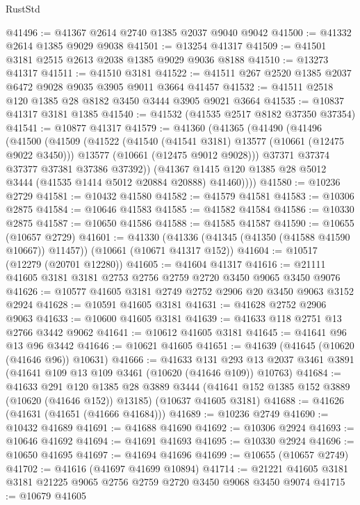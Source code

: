 \begin{lexlean}{RustStd}
\begin{coremodule}
@41496 := @41367 @2614 @2740 @1385 @2037 @9040 @9042
@41500 := @41332 @2614 @1385 @9029 @9038
@41501 := @13254 @41317
@41509 := @41501 @3181 @2515 @2613 @2038 @1385 @9029 @9036 @8188
@41510 := @13273 @41317
@41511 := @41510 @3181
@41522 := @41511 @267 @2520 @1385 @2037 @6472 @9028 @9035 @3905 @9011 @3664 @41457
@41532 := @41511 @2518 @120 @1385 @28 @8182 @3450 @3444 @3905 @9021 @3664
@41535 := @10837 @41317 @3181 @1385
@41540 := @41532 (@41535 @2517 @8182 @37350 @37354)
@41541 := @10877 @41317
@41579 := @41360
    (@41365
      (@41490
        (@41496
          (@41500
            (@41509
              (@41522
                (@41540 (@41541 @3181) @13577 (@10661 (@12475 @9022 @3450)))
                @13577
                (@10661 (@12475 @9012 @9028)))
              @37371
              @37374
              @37377
              @37381
              @37386
              @37392))
          (@41367 @1415 @120 @1385 @28 @5012 @3444 (@41535 @1414 @5012 @20884 @20888) @41460))))
@41580 := @10236 @2729
@41581 := @10432 @41580
@41582 := @41579 @41581
@41583 := @10306 @2875
@41584 := @10646 @41583
@41585 := @41582 @41584
@41586 := @10330 @2875
@41587 := @10650 @41586
@41588 := @41585 @41587
@41590 := @10655 (@10657 @2729)
@41601 := @41330
    (@41336 (@41345 (@41350 (@41588 @41590 @10667)) @11457))
    (@10661 (@10671 @41317 @152))
@41604 := @10517 (@12279 (@20701 @12280))
@41605 := @41604 @41317
@41616 := @21111 @41605 @3181 @3181 @2753 @2756 @2759 @2720 @3450 @9065 @3450 @9076
@41626 := @10577 @41605 @3181 @2749 @2752 @2906 @20 @3450 @9063 @3152 @2924
@41628 := @10591 @41605 @3181
@41631 := @41628 @2752 @2906 @9063
@41633 := @10600 @41605 @3181
@41639 := @41633 @118 @2751 @13 @2766 @3442 @9062
@41641 := @10612 @41605 @3181
@41645 := @41641 @96 @13 @96 @3442
@41646 := @10621 @41605
@41651 := @41639 (@41645 (@10620 (@41646 @96)) @10631)
@41666 := @41633
    @131
    @293
    @13
    @2037
    @3461
    @3891
    (@41641 @109 @13 @109 @3461 (@10620 (@41646 @109)) @10763)
@41684 := @41633
    @291
    @120
    @1385
    @28
    @3889
    @3444
    (@41641 @152 @1385 @152 @3889 (@10620 (@41646 @152)) @13185)
    (@10637 @41605 @3181)
@41688 := @41626 (@41631 (@41651 (@41666 @41684)))
@41689 := @10236 @2749
@41690 := @10432 @41689
@41691 := @41688 @41690
@41692 := @10306 @2924
@41693 := @10646 @41692
@41694 := @41691 @41693
@41695 := @10330 @2924
@41696 := @10650 @41695
@41697 := @41694 @41696
@41699 := @10655 (@10657 @2749)
@41702 := @41616 (@41697 @41699 @10894)
@41714 := @21221 @41605 @3181 @3181 @21225 @9065 @2756 @2759 @2720 @3450 @9068 @3450 @9074
@41715 := @10679 @41605

\end{coremodule}
\end{lexlean}
